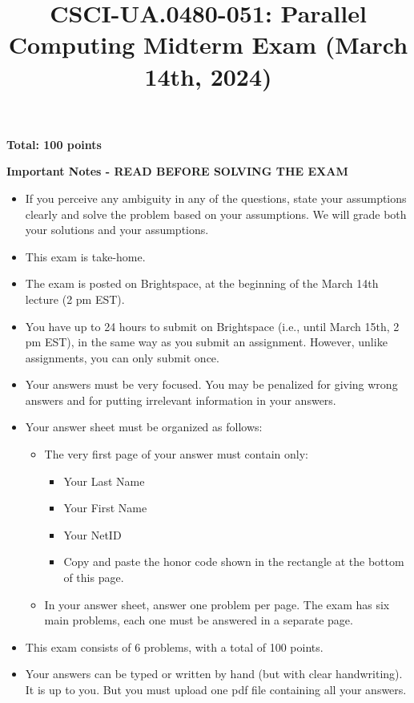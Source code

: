 \documentclass{article}
\title{CSCI-UA.0480-051: Parallel Computing Midterm Exam (March 14th, 2024)}
\author{}
\date{}
\begin{document}
\maketitle

\textbf{Total: 100 points}

\textbf{Important Notes - READ BEFORE SOLVING THE EXAM}

\begin{itemize}
    \item If you perceive any ambiguity in any of the questions, state your assumptions clearly and solve the problem based on your assumptions. We will grade both your solutions and your assumptions.
    \item This exam is take-home.
    \item The exam is posted on Brightspace, at the beginning of the March 14th lecture (2 pm EST).
    \item You have up to 24 hours to submit on Brightspace (i.e., until March 15th, 2 pm EST), in the same way as you submit an assignment. However, unlike assignments, you can only submit once.
    \item Your answers must be very focused. You may be penalized for giving wrong answers and for putting irrelevant information in your answers.
    \item Your answer sheet must be organized as follows:
    \begin{itemize}
        \item The very first page of your answer must contain only:
        \begin{itemize}
            \item Your Last Name
            \item Your First Name
            \item Your NetID
            \item Copy and paste the honor code shown in the rectangle at the bottom of this page.
        \end{itemize}
        \item In your answer sheet, answer one problem per page. The exam has six main problems, each one must be answered in a separate page.
    \end{itemize}
    \item This exam consists of 6 problems, with a total of 100 points.
    \item Your answers can be typed or written by hand (but with clear handwriting). It is up to you. But you must upload one pdf file containing all your answers.
\end{itemize}
\end{document}
